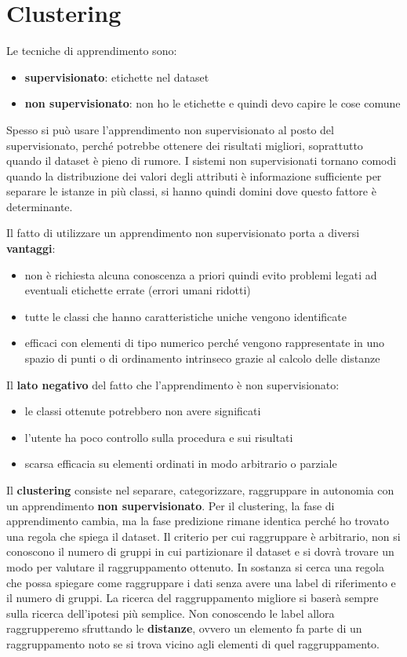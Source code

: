 \chapter{Clustering}
Le tecniche di apprendimento sono:
\begin{itemize}
    \item \textbf{supervisionato}: etichette nel dataset
    \item \textbf{non supervisionato}: non ho le etichette e quindi devo capire
          le cose comune
\end{itemize}
Spesso si può usare l'apprendimento non supervisionato al posto del supervisionato,
perché potrebbe ottenere dei risultati migliori, soprattutto quando il dataset è
pieno di rumore. I sistemi non supervisionati tornano comodi quando la distribuzione dei
valori degli attributi è informazione sufficiente per separare le istanze in più
classi, si hanno quindi domini dove questo fattore è determinante.

Il fatto di utilizzare un apprendimento non supervisionato porta a diversi \textbf{vantaggi}:
\begin{itemize}
    \item non è richiesta alcuna conoscenza a priori quindi evito problemi legati
          ad eventuali etichette errate (errori umani ridotti)
    \item tutte le classi che hanno caratteristiche uniche vengono identificate
    \item efficaci con elementi di tipo numerico perché vengono rappresentate in
          uno spazio di punti o di ordinamento intrinseco grazie al calcolo delle distanze
\end{itemize}
Il \textbf{lato negativo} del fatto che l'apprendimento è non supervisionato:
\begin{itemize}
    \item le classi ottenute potrebbero non avere significati
    \item l'utente ha poco controllo sulla procedura e sui risultati
    \item scarsa efficacia su elementi ordinati in modo arbitrario o parziale
\end{itemize}
Il \textbf{clustering} consiste nel  separare, categorizzare, raggruppare in
autonomia con un apprendimento \textbf{non supervisionato}.
Per il clustering, la fase di apprendimento cambia, ma la fase predizione rimane
identica perché ho trovato una regola che spiega il dataset. Il criterio per cui
raggruppare è arbitrario, non si conoscono il numero di gruppi in cui partizionare il dataset
e si dovrà trovare un modo per valutare il raggruppamento ottenuto.
In sostanza si cerca una regola che possa spiegare come raggruppare i dati senza
avere una label di riferimento e il numero di gruppi. La ricerca del raggruppamento migliore
si baserà sempre sulla ricerca dell'ipotesi più semplice. Non conoscendo le
label allora raggrupperemo sfruttando le \textbf{distanze}, ovvero un elemento
fa parte di un raggruppamento noto se si trova vicino agli elementi di quel
raggruppamento.

